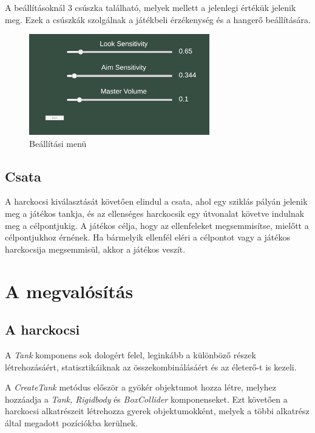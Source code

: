 \documentclass[
]{thesis-ekf}
\theoremstyle{definition}
\theoremstyle{remark}
\begin{document}
A beállításoknál 3 csúszka található, melyek mellett a jelenlegi értékük jelenik meg. Ezek a csúszkák szolgálnak a játékbeli érzékenység és a hangerő beállítására.

\begin{figure}[H]
    \centering
    \includegraphics[width=0.7\textwidth]{screenshots/settings.png}
    \caption{Beállítási menü}
    \label{fig:settings}
\end{figure}

\subsection{Csata}

A harckocsi kiválasztását követően elindul a csata, ahol egy sziklás pályán jelenik meg a játékos tankja, és az ellenséges harckocsik egy útvonalat követve indulnak meg a  célpontjukig. A játékos célja, hogy az ellenfeleket megsemmisítse, mielőtt a célpontjukhoz érnének. Ha bármelyik ellenfél eléri a célpontot vagy a játékos harckocsija megsemmisül, akkor a játékos veszít.

\section{A megvalósítás}

\subsection{A harckocsi}

A \emph{Tank} komponens sok dologért felel, leginkább a különböző részek létrehozásáért, statisztikáiknak az összekombinálásáért és az életerő-t is kezeli.



A \emph{CreateTank} metódus először a gyökér objektumot hozza létre, melyhez hozzáadja a \emph{Tank, Rigidbody} és \emph{BoxCollider} komponenseket. Ezt követően a harckocsi alkatrészeit létrehozza gyerek objektumokként, melyek a többi alkatrész által megadott pozíciókba kerülnek.
\end{document}
